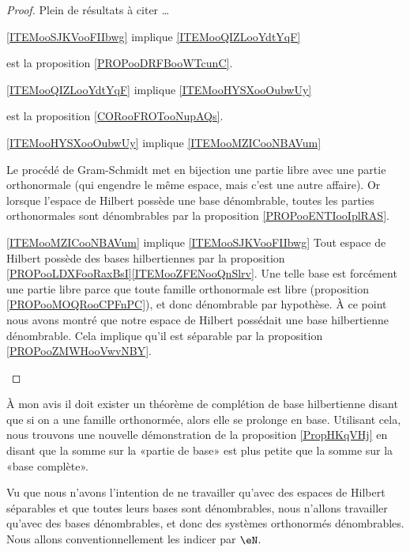 \begin{proof}
    Plein de résultats à citer \ldots
    \begin{subproof}
        \item[\ref{ITEMooSJKVooFIIbwg} implique \ref{ITEMooQIZLooYdtYqF}]

            est la proposition \ref{PROPooDRFBooWTcunC}.

    \item[\ref{ITEMooQIZLooYdtYqF} implique \ref{ITEMooHYSXooOubwUy}]
         
        est la proposition \ref{CORooFROTooNupAQs}.


    \item[\ref{ITEMooHYSXooOubwUy} implique \ref{ITEMooMZICooNBAVum}]

        Le procédé de Gram-Schmidt met en bijection une partie libre avec une partie orthonormale (qui engendre le même espace, mais c'est une autre affaire). Or lorsque l'espace de Hilbert possède une base dénombrable, toutes les parties orthonormales sont dénombrables par la proposition \ref{PROPooENTIooIplRAS}.

    \item[\ref{ITEMooMZICooNBAVum} implique \ref{ITEMooSJKVooFIIbwg}]
        Tout espace de Hilbert possède des bases hilbertiennes par la proposition \ref{PROPooLDXFooRaxBsI}\ref{ITEMooZFENooQnSlrv}. Une telle base est forcément une partie libre parce que toute famille orthonormale est libre (proposition \ref{PROPooMOQRooCPFnPC}), et donc dénombrable par hypothèse. À ce point nous avons montré que notre espace de Hilbert possédait une base hilbertienne dénombrable. Cela implique qu'il est séparable par la proposition \ref{PROPooZMWHooVwvNBY}.
        \end{subproof}
\end{proof}

\begin{remark}  \label{RemfdJcQF}
    À mon avis il doit exister un théorème de complétion de base hilbertienne disant que si on a une famille orthonormée, alors elle se prolonge en base. Utilisant cela, nous trouvons une nouvelle démonstration de la proposition \ref{PropHKqVHj} en disant que la somme sur la «partie de base» est plus petite que la somme sur la «base complète».
\end{remark}

\begin{normaltext}
    Vu que nous n'avons l'intention de ne travailler qu'avec des espaces de Hilbert séparables et que toutes leurs bases sont dénombrables, nous n'allons travailler qu'avec des bases dénombrables, et donc des systèmes orthonormés dénombrables. Nous allons conventionnellement les indicer par \( \eN\).
\end{normaltext}


